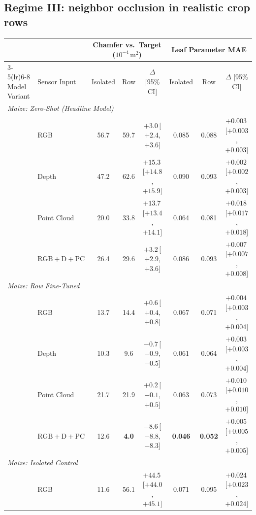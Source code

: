 \subsection{Regime III: neighbor occlusion in realistic crop rows}
\label{sec:regime3}\label{sec:exp-occlusion}

\begin{table}[t]
  \centering\scriptsize
  \setlength{\tabcolsep}{3.0pt}
  \begin{tabular}{l l ccc ccc}
    \toprule
    & & \multicolumn{3}{c}{Chamfer vs.\ Target ($10^{-4}\,\mathrm{m}^2$)} & \multicolumn{3}{c}{Leaf Parameter MAE} \\
    \cmidrule(lr){3-5}\cmidrule(lr){6-8}
    Model Variant & Sensor Input & Isolated & Row & $\Delta$ [95\% CI] & Isolated & Row & $\Delta$ [95\% CI] \\
    \midrule
    \multicolumn{8}{l}{\emph{Maize: Zero-Shot (Headline Model)}} \\
    & RGB & 56.7 & 59.7 & $+3.0$\,{\tiny[$+2.4$, $+3.6$]} & 0.085 & 0.088 & $+0.003$\,{\tiny[$+0.003$, $+0.003$]} \\
    & Depth & 47.2 & 62.6 & $+15.3$\,{\tiny[$+14.8$, $+15.9$]} & 0.090 & 0.093 & $+0.002$\,{\tiny[$+0.002$, $+0.003$]} \\
    & Point Cloud & 20.0 & 33.8 & $+13.7$\,{\tiny[$+13.4$, $+14.1$]} & 0.064 & 0.081 & $+0.018$\,{\tiny[$+0.017$, $+0.018$]} \\
    & $\mathrm{RGB}+\mathrm{D}+\mathrm{PC}$ & 26.4 & 29.6 & $+3.2$\,{\tiny[$+2.9$, $+3.6$]} & 0.086 & 0.093 & $+0.007$\,{\tiny[$+0.007$, $+0.008$]} \\
    \midrule
    \multicolumn{8}{l}{\emph{Maize: Row Fine-Tuned}} \\
    & RGB & 13.7 & 14.4 & $+0.6$\,{\tiny[$+0.4$, $+0.8$]} & 0.067 & 0.071 & $+0.004$\,{\tiny[$+0.003$, $+0.004$]} \\
    & Depth & 10.3 & 9.6 & $-0.7$\,{\tiny[$-0.9$, $-0.5$]} & 0.061 & 0.064 & $+0.003$\,{\tiny[$+0.003$, $+0.004$]} \\
    & Point Cloud & 21.7 & 21.9 & $+0.2$\,{\tiny[$-0.1$, $+0.5$]} & 0.063 & 0.073 & $+0.010$\,{\tiny[$+0.010$, $+0.010$]} \\
    & $\mathrm{RGB}+\mathrm{D}+\mathrm{PC}$ & 12.6 & \textbf{4.0} & $-8.6$\,{\tiny[$-8.8$, $-8.3$]} & \textbf{0.046} & \textbf{0.052} & $+0.005$\,{\tiny[$+0.005$, $+0.005$]} \\
    \midrule
    \multicolumn{8}{l}{\emph{Maize: Isolated Control}} \\
    & RGB & 11.6 & 56.1 & $+44.5$\,{\tiny[$+44.0$, $+45.1$]} & 0.071 & 0.095 & $+0.024$\,{\tiny[$+0.023$, $+0.024$]} \\

\end{tabular}
\end{table}
